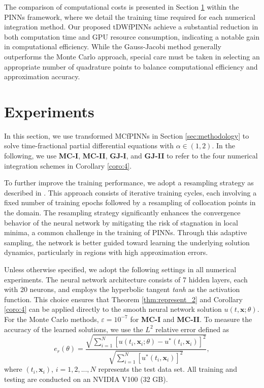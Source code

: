 \documentclass[preprint,3p,times]{elsarticle}
\def\x{\mathbf{x}}
\begin{document}
The comparison of computational costs is presented in Section \ref{sec:experiments} within the PINNs framework, where we detail the training time required for each numerical integration method. Our proposed tDWfPINNs achieve a substantial reduction in both computation time and GPU resource consumption, indicating a notable gain in computational efficiency. While the Gauss-Jacobi method generally outperforms the Monte Carlo approach, special care must be taken in selecting an appropriate number of quadrature points to balance computational efficiency and approximation accuracy.

\section{Experiments}
\label{sec:experiments}

In this section, we use transformed MCfPINNs in Section \ref{sec:methodology} to solve time-fractional partial differential equations with $\alpha \in (1, 2)$. In the following, we use \textbf{MC-I}, \textbf{MC-II}, \textbf{GJ-I}, and \textbf{GJ-II} to refer to the four numerical integration schemes in Corollary \ref{coro:4}.

To further improve the training performance, we adopt a resampling strategy as described in \cite{Zhang2025}. This approach consists of iterative training cycles, each involving a fixed number of training epochs followed by a resampling of collocation points in the domain. The resampling strategy significantly enhances the convergence behavior of the neural network by mitigating the risk of stagnation in local minima, a common challenge in the training of PINNs. Through this adaptive sampling, the network is better guided toward learning the underlying solution dynamics, particularly in regions with high approximation errors. 

 Unless otherwise specified, we adopt the following settings in all numerical experiments. The neural network architecture consists of 7 hidden layers, each with 20 neurons, and employs the hyperbolic tangent \textit{tanh} as the activation function. This choice ensures that Theorem \ref{thm:represent_2} and Corollary \ref{coro:4} can be applied directly to the smooth neural network solution $u(t,\x;\theta)$. For the Monte Carlo methods, $\varepsilon=10^{-7}$ for \textbf{MC-I} and \textbf{MC-II}. To measure the accuracy of the learned solutions, we use the $L^2$ relative error defined as 
\begin{equation}
    \label{eqn:l2err}
    e_r(\theta) = \frac{\sqrt{\sum_{i=1}^{N} [u(t_i,\x_i;\theta)-u^*(t_i,\x_i)]^2}}{\sqrt{\sum_{i=1}^{N} [u^*(t_i,\x_i)]^2}},
\end{equation}
where $(t_i,\x_i)$, $i=1,2,...,N$ represents the test data set. All training and testing are conducted on an NVIDIA V100 (32 GB).
\end{document}

